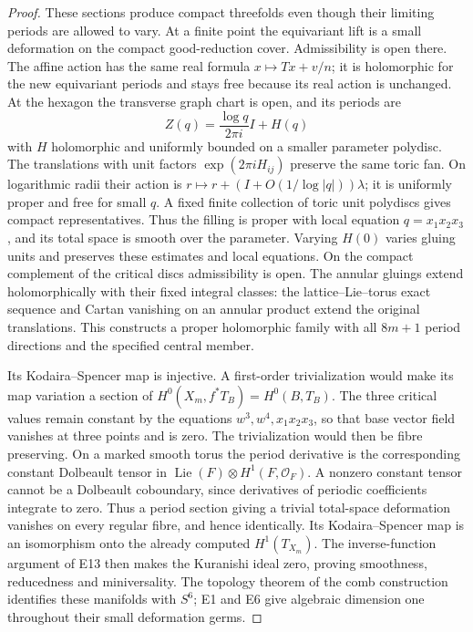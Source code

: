 \begin{proof}
These sections produce compact threefolds even though their
limiting periods are allowed to vary. At a finite point the
equivariant lift is a small deformation on the compact
good-reduction cover. Admissibility is open there. The affine
action has the same real formula $x\mapsto Tx+v/n$; it is
holomorphic for the new equivariant periods and stays free
because its real action is unchanged. At the hexagon the
transverse graph chart is open, and its periods are
\[
 Z(q)=\frac{\log q}{2\pi i}I+H(q)
\]
with $H$ holomorphic and uniformly bounded on a smaller parameter
polydisc. The translations with unit factors
$\exp(2\pi iH_{ij})$ preserve the same toric fan. On logarithmic
radii their action is
$r\mapsto r+(I+O(1/\log|q|))\lambda$; it is uniformly proper
and free for small $q$. A fixed finite collection of toric unit
polydiscs gives compact representatives. Thus the filling is
proper with local equation $q=x_1x_2x_3$, and its total space
is smooth over the parameter. Varying $H(0)$ varies gluing units
and preserves these estimates and local equations. On the
compact complement of the critical discs admissibility is open.
The annular gluings extend holomorphically with their fixed
integral classes: the lattice--Lie--torus exact sequence and
Cartan vanishing on an annular product extend the original
translations. This constructs a proper holomorphic family with
all $8m+1$ period directions and the specified central member.

Its Kodaira--Spencer map is injective. A first-order trivialization
would make its map variation a section of
$H^0(X_m,f^*T_B)=H^0(B,T_B)$. The three critical values remain
constant by the equations $w^3,w^4,x_1x_2x_3$, so that base
vector field vanishes at three points and is zero. The
trivialization would then be fibre preserving. On a marked
smooth torus the period derivative is the corresponding
constant Dolbeault tensor in
$\operatorname{Lie}(F)\otimes H^1(F,\mathcal O_F)$.
A nonzero constant tensor cannot be a Dolbeault coboundary,
since derivatives of periodic coefficients integrate to zero.
Thus a period section giving a trivial total-space deformation
vanishes on every regular fibre, and hence identically. Its
Kodaira--Spencer map is an isomorphism onto the already computed
$H^1(T_{X_m})$. The inverse-function argument of E13 then makes
the Kuranishi ideal zero, proving smoothness, reducedness and
miniversality. The topology theorem of the comb construction
identifies these manifolds with $S^6$; E1 and E6 give algebraic
dimension one throughout their small deformation germs.
\end{proof}

